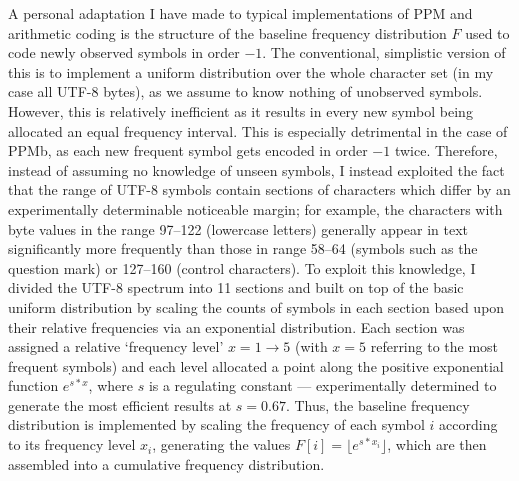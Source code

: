 \documentclass[a4paper, 11pt]{article}
\begin{document}
A personal adaptation I have made to typical implementations of PPM and arithmetic coding is the structure of the baseline frequency distribution $F$ used to code newly observed symbols in order $-1$. The conventional, simplistic version of this is to implement a uniform distribution over the whole character set (in my case all UTF-8 bytes), as we assume to know nothing of unobserved symbols. However, this is relatively inefficient as it results in every new symbol being allocated an equal frequency interval. This is especially detrimental in the case of PPMb, as each new frequent symbol gets encoded in order $-1$ twice. Therefore, instead of assuming no knowledge of unseen symbols, I instead exploited the fact that the range of UTF-8 symbols contain sections of characters which differ by an experimentally determinable noticeable margin; for example, the characters with byte values in the range 97--122 (lowercase letters) generally appear in text significantly more frequently than those in range 58--64 (symbols such as the question mark) or 127--160 (control characters). To exploit this knowledge, I divided the UTF-8 spectrum into 11 sections and built on top of the basic uniform distribution by scaling the counts of symbols in each section based upon their relative frequencies via an exponential distribution. Each section was assigned a relative ‘frequency level’ $x = 1 \to 5$ (with $x=5$ referring to the most frequent symbols) and each level allocated a point along the positive exponential function $e^{s * x}$, where $s$ is a regulating constant --- experimentally determined to generate the most efficient results at $s = 0.67$. Thus, the baseline frequency distribution is implemented by scaling the frequency of each symbol $i$ according to its frequency level $x_{i}$, generating the values $F[i] = \lfloor e^{s * x_{i}} \rfloor$, which are then assembled into a cumulative frequency distribution.
    
\end{document}
